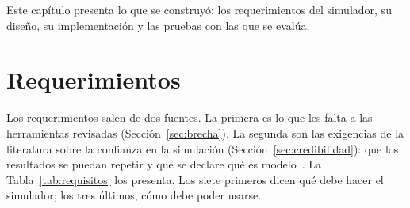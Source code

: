 
Este capítulo presenta lo que se construyó: los requerimientos del simulador, su
diseño, su implementación y las pruebas con las que se evalúa.

\section{Requerimientos}
\label{sec:requisitos}

Los requerimientos salen de dos fuentes. La primera es lo que les falta a las
herramientas revisadas (Sección~\ref{sec:brecha}). La segunda son las exigencias
de la literatura sobre la confianza en la simulación
(Sección~\ref{sec:credibilidad}): que los resultados se puedan repetir y que se
declare qué es modelo~\cite{Pawlikowski2002Credibility,Kurkowski2005Incredibles}.
La Tabla~\ref{tab:requisitos} los presenta. Los siete primeros dicen qué debe
hacer el simulador; los tres últimos, cómo debe poder usarse.

